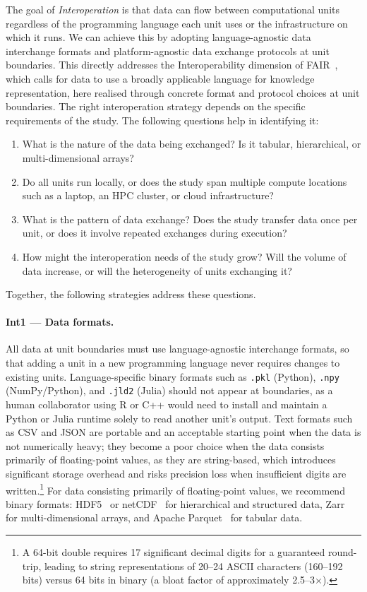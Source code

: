 \documentclass{eceasst}
\begin{document}
The goal of \emph{Interoperation} is that data can flow between computational units
regardless of the programming language each unit uses or the infrastructure on
which it runs. We can achieve this by adopting language-agnostic data interchange
formats and platform-agnostic data exchange protocols at unit boundaries. This directly addresses the Interoperability dimension of
FAIR~\cite{wilkinson2016fair}, which calls for data to use a broadly applicable
language for knowledge representation, here realised through concrete format
and protocol choices at unit boundaries.
The right interoperation strategy depends on the specific requirements of the
study. The following questions help in identifying it:

\begin{enumerate}
  \item What is the nature of the data being exchanged? Is it tabular,
        hierarchical, or multi-dimensional arrays?
  \item Do all units run locally, or does the study span multiple compute
        locations such as a laptop, an HPC cluster, or cloud infrastructure?
  \item What is the pattern of data exchange? Does the study transfer data once
        per unit, or does it involve repeated exchanges during execution?
  \item How might the interoperation needs of the study grow? Will the volume
        of data increase, or will the heterogeneity of units exchanging it?
\end{enumerate}

Together, the following strategies address these questions.

\paragraph{Int1 --- Data formats.}
All data at unit boundaries must use language-agnostic interchange formats,
so that adding a unit in a new programming language never requires changes to
existing units. Language-specific binary formats such as \texttt{.pkl}
(Python), \texttt{.npy} (NumPy/Python), and \texttt{.jld2} (Julia) should not
appear at boundaries, as a human collaborator using R or C++ would need to install
and maintain a Python or Julia runtime solely to read another unit's output.
Text formats such as CSV and JSON are portable and an acceptable starting point
when the data is not numerically heavy; they become a poor choice when the data
consists primarily of floating-point values, as they are string-based, which
introduces significant storage overhead and risks precision loss when
insufficient digits are written.\footnote{A 64-bit double requires 17
significant decimal digits for a guaranteed round-trip, leading to string
representations of 20--24 ASCII characters (160--192 bits) versus 64 bits in
binary (a bloat factor of approximately 2.5--3$\times$).} For data consisting
primarily of floating-point values, we recommend binary formats: HDF5~\cite{hdf5}
or netCDF~\cite{netcdf} for hierarchical and structured data, Zarr~\cite{moore2023zarr} for
multi-dimensional arrays, and Apache Parquet~\cite{apacheparquet} for
tabular data.
\end{document}
